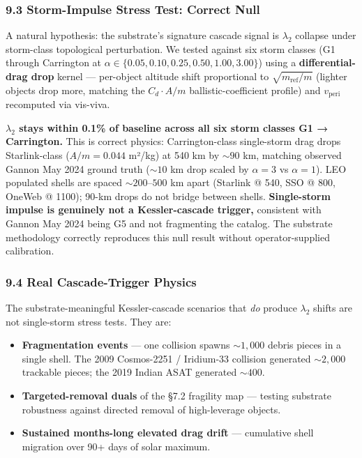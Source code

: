 \documentclass[
]{article}
\providecommand{\tightlist}{%
  \setlength{\itemsep}{0pt}\setlength{\parskip}{0pt}}
\begin{document}
\subsubsection{9.3 Storm-Impulse Stress Test: Correct
Null}\label{storm-impulse-stress-test-correct-null}

A natural hypothesis: the substrate's signature cascade signal is
\(\lambda_2\) collapse under storm-class topological perturbation. We
tested against six storm classes (G1 through Carrington at
\(\alpha \in \{0.05, 0.10, 0.25, 0.50, 1.00, 3.00\}\)) using a
\textbf{differential-drag drop} kernel --- per-object altitude shift
proportional to \(\sqrt{m_\text{ref}/m}\) (lighter objects drop more,
matching the \(C_d \cdot A/m\) ballistic-coefficient profile) and
\(v_\text{peri}\) recomputed via vis-viva.

\textbf{\(\lambda_2\) stays within 0.1\% of baseline across all six
storm classes G1 → Carrington.} This is correct physics:
Carrington-class single-storm drag drops Starlink-class (\(A/m = 0.044\)
m²/kg) at 540 km by \(\sim 90\) km, matching observed Gannon May 2024
ground truth (\(\sim 10\) km drop scaled by \(\alpha = 3\) vs
\(\alpha = 1\)). LEO populated shells are spaced \(\sim 200\)--\(500\)
km apart (Starlink @ 540, SSO @ 800, OneWeb @ 1100); 90-km drops do not
bridge between shells. \textbf{Single-storm impulse is genuinely not a
Kessler-cascade trigger,} consistent with Gannon May 2024 being G5 and
not fragmenting the catalog. The substrate methodology correctly
reproduces this null result without operator-supplied calibration.

\subsubsection{9.4 Real Cascade-Trigger
Physics}\label{real-cascade-trigger-physics}

The substrate-meaningful Kessler-cascade scenarios that \emph{do}
produce \(\lambda_2\) shifts are not single-storm stress tests. They
are:

\begin{itemize}
\tightlist
\item
  \textbf{Fragmentation events} --- one collision spawns
  \(\sim 1{,}000\) debris pieces in a single shell. The 2009 Cosmos-2251
  / Iridium-33 collision generated \(\sim 2{,}000\) trackable pieces;
  the 2019 Indian ASAT generated \(\sim 400\).
\item
  \textbf{Targeted-removal duals} of the §7.2 fragility map --- testing
  substrate robustness against directed removal of high-leverage
  objects.
\item
  \textbf{Sustained months-long elevated drag drift} --- cumulative
  shell migration over 90+ days of solar maximum.
\end{itemize}
\end{document}
